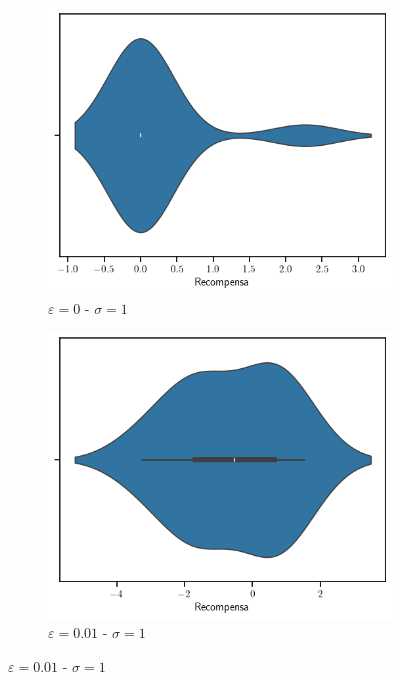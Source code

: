 \documentclass[12pt]{article}
\begin{document}
\begin{figure}[]
        \begin{subfigure}[H]{0.3\textwidth}
            \includegraphics[width=\textwidth]{../img/values_sigma_1_epsilon_0}
            \caption{$\varepsilon=0$ - $\sigma=1$}
            \label{fig:estimations_3}
        \end{subfigure}
        \begin{subfigure}[H]{0.3\textwidth}
            \includegraphics[width=\textwidth]{../img/values_sigma_1_epsilon_0.01}
            \caption{$\varepsilon=0.01$ - $\sigma=1$}
            \label{fig:estimations_4}

\end{subfigure}
\end{figure}
\end{document}
